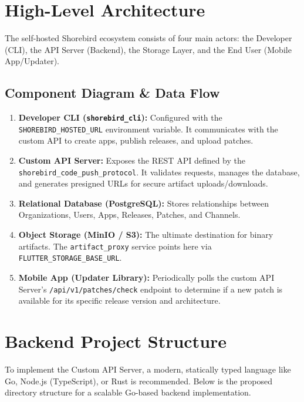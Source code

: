 \documentclass[12pt,a4paper]{article}
\begin{document}
\newpage

\section{High-Level Architecture}
The self-hosted Shorebird ecosystem consists of four main actors: the Developer (CLI), the API Server (Backend), the Storage Layer, and the End User (Mobile App/Updater).

\subsection{Component Diagram \& Data Flow}
\begin{enumerate}
    \item \textbf{Developer CLI (\texttt{shorebird\_cli}):} Configured with the \texttt{SHOREBIRD\_HOSTED\_URL} environment variable. It communicates with the custom API to create apps, publish releases, and upload patches.
    \item \textbf{Custom API Server:} Exposes the REST API defined by the \texttt{shorebird\_code\_push\_protocol}. It validates requests, manages the database, and generates presigned URLs for secure artifact uploads/downloads.
    \item \textbf{Relational Database (PostgreSQL):} Stores relationships between Organizations, Users, Apps, Releases, Patches, and Channels.
    \item \textbf{Object Storage (MinIO / S3):} The ultimate destination for binary artifacts. The \texttt{artifact\_proxy} service points here via \texttt{FLUTTER\_STORAGE\_BASE\_URL}.
    \item \textbf{Mobile App (Updater Library):} Periodically polls the custom API Server's \texttt{/api/v1/patches/check} endpoint to determine if a new patch is available for its specific release version and architecture.
\end{enumerate}

\newpage

\section{Backend Project Structure}
To implement the Custom API Server, a modern, statically typed language like Go, Node.js (TypeScript), or Rust is recommended. Below is the proposed directory structure for a scalable Go-based backend implementation.
\end{document}
